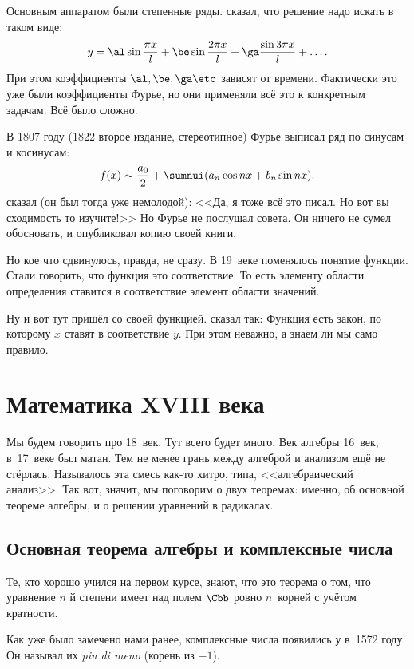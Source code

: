\documentclass[a4paper,oneside,fleqn,10pt]{article}
\begin{document}
Основным аппаратом были степенные ряды.  сказал, что решение надо искать в таком
виде:
$$y = \al \sin \frac{\pi x}{l} + \be \sin \frac{2\pi x}{l} +
\ga\frac{\sin 3\pi x}{l}+\ldots.$$ При этом коэффициенты $\al, \be,
\ga\etc$ зависят от времени. Фактически это уже были коэффициенты
Фурье, но они применяли всё это к конкретным задачам. Всё было сложно.

В 1807 году (1822 второе издание, стереотипное) Фурье выписал ряд по
синусам и косинусам:
$$f(x) \sim \frac{a_0}{2} + \sumnui (a_n \cos nx + b_n \sin nx).$$
 сказал (он был тогда уже немолодой): <<Да, я тоже всё
это писал. Но вот вы сходимость то изучите!>> Но Фурье не послушал
совета. Он ничего не сумел обосновать, и опубликовал копию своей
книги.

Но кое что сдвинулось, правда, не сразу. В 19~веке поменялось понятие
функции. Стали говорить, что функция это соответствие. То есть
элементу области определения ставится в соответствие элемент области
значений.

Ну и вот тут пришёл  со своей
функцией.  сказал так: Функция есть закон, по
которому $x$ ставят в соответствие $y$. При этом неважно, а знаем ли
мы само правило.




\section{Математика XVIII века}

Мы будем говорить про 18~век. Тут всего будет много. Век алгебры
16~век, в~17~веке был матан. Тем не менее грань между алгеброй и
анализом ещё не стёрлась. Называлось эта смесь как-то хитро, типа,
<<алгебраический анализ>>.  Так вот, значит, мы поговорим о двух
теоремах: именно, об основной теореме алгебры, и о решении уравнений в
радикалах.


\subsection{Основная теорема алгебры и комплексные числа}

Те, кто хорошо учился на первом курсе, знают, что это теорема о том,
что уравнение $n$ й степени имеет над полем $\Cbb$ ровно $n$~корней с
учётом кратности.

Как уже было замечено нами ранее, комплексные числа появились у
 в~1572 году.  Он называл их \emph{piu di meno} (корень
из $-1$).
\end{document}

